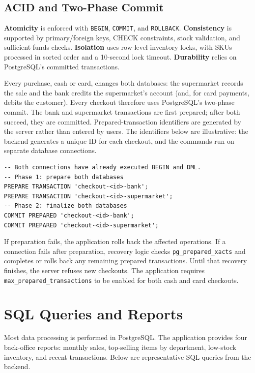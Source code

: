 \documentclass[11pt,letterpaper]{article}
\begin{document}
\subsection{ACID and Two-Phase Commit}

\textbf{Atomicity} is enforced with \texttt{BEGIN}, \texttt{COMMIT}, and \texttt{ROLLBACK}. \textbf{Consistency} is supported by primary/foreign keys, CHECK constraints, stock validation, and sufficient-funds checks. \textbf{Isolation} uses row-level inventory locks, with SKUs processed in sorted order and a 10-second lock timeout. \textbf{Durability} relies on PostgreSQL's committed transactions.

Every purchase, cash or card, changes both databases: the supermarket records the sale and the bank credits the supermarket's account (and, for card payments, debits the customer). Every checkout therefore uses PostgreSQL's two-phase commit. The bank and supermarket transactions are first prepared; after both succeed, they are committed. Prepared-transaction identifiers are generated by the server rather than entered by users. The identifiers below are illustrative: the backend generates a unique ID for each checkout, and the commands run on separate database connections.

\begin{lstlisting}
-- Both connections have already executed BEGIN and DML.
-- Phase 1: prepare both databases
PREPARE TRANSACTION 'checkout-<id>-bank';
PREPARE TRANSACTION 'checkout-<id>-supermarket';
-- Phase 2: finalize both databases
COMMIT PREPARED 'checkout-<id>-bank';
COMMIT PREPARED 'checkout-<id>-supermarket';
\end{lstlisting}

If preparation fails, the application rolls back the affected operations. If a connection fails after preparation, recovery logic checks \texttt{pg\_prepared\_xacts} and completes or rolls back any remaining prepared transactions. Until that recovery finishes, the server refuses new checkouts. The application requires \texttt{max\_prepared\_transactions} to be enabled for both cash and card checkouts.

\section{SQL Queries and Reports}

Most data processing is performed in PostgreSQL. The application provides four back-office reports: monthly sales, top-selling items by department, low-stock inventory, and recent transactions. Below are representative SQL queries from the backend.
\end{document}
